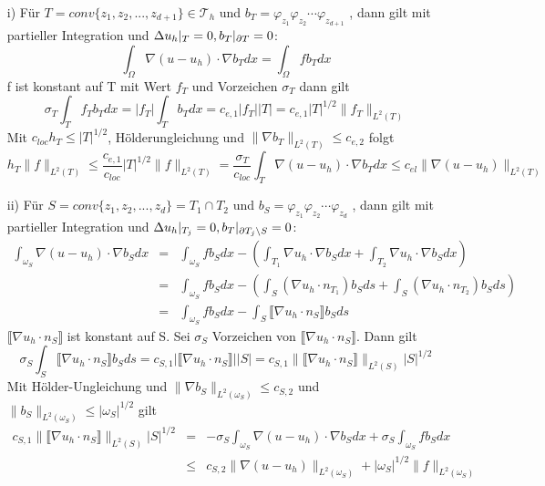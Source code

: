 \begin{itemize}
	\item[i)] 
	Für $T =conv\{z_1,z_2,...,z_{d+1}\} \in\mathscr{T}_h$ und $b_T = \varphi_{z_1}\varphi_{z_2}\cdots\varphi_{z_{d+1}}$ , dann gilt mit partieller Integration und $\Delta u_h|_T = 0, b_T|_{\partial T} = 0$:
	\[
	\int_{\Omega} \nabla (u - u_h) \cdot \nabla b_Tdx =\int_{\Omega} f b_T dx
	\]
    f ist konstant auf T mit Wert $f_T$ und Vorzeichen $\sigma_T$ dann gilt
    \[
    \sigma_T\int_{T}f_Tb_Tdx=|f_T|\int_{T}b_Tdx=c_{e,1}|f_T||T|= c_{e,1}|T|^{1/2}\|f_T\|_{L^2(T)}
    \]
    Mit $c_{loc}h_T \leq |T|^{1/2}$, Hölderungleichung und $\|\nabla b_T\|_{L^2(T)} \leq c_{e,2}$ folgt
    \[
    h_T\|f\|_{L^2(T)}\leq \frac{c_{e,1}}{c_{loc}} |T|^{1/2}\|f\|_{L^2(T)} =\frac{\sigma_T}{c_{loc}}\int_{T}\nabla (u - u_h) \cdot \nabla b_Tdx \leq c_{el} \|\nabla (u-u_h)\|_{L^2(T)}
    \]
    \item[ii)]
    Für $S =conv\{z_1,z_2,...,z_{d}\} = T_1 \cap T_2$ und $b_S = \varphi_{z_1}\varphi_{z_2}\cdots\varphi_{z_{d}}$ , dann gilt mit partieller Integration und $\Delta u_h|_{T_j} = 0, b_T|_{\partial T_j\setminus S} = 0$:
    \begin{eqnarray*}
    	\int_{\omega_S} \nabla (u-u_h)\cdot \nabla b_S dx &=& \int_{\omega_S} fb_Sdx -\left(\int_{T_1} \nabla u_h\cdot \nabla b_S dx + \int_{T_2} \nabla u_h\cdot \nabla b_S dx\right) \\
    	&=& \int_{\omega_S} fb_Sdx - \left(\int_{S} (\nabla u_h\cdot n_{T_1}) b_S ds + \int_{S} (\nabla u_h\cdot n_{T_2}) b_S ds\right)\\
    	&=& \int_{\omega_S} fb_Sdx - \int_{S} \llbracket \nabla u_h \cdot n_S\rrbracket b_S ds
    \end{eqnarray*}
    $\llbracket \nabla u_h \cdot n_S\rrbracket$ ist konstant auf S. Sei $\sigma_S$ Vorzeichen von $\llbracket \nabla u_h \cdot n_S\rrbracket$. Dann gilt
    \[
    \sigma_S \int_{S} \llbracket \nabla u_h \cdot n_S\rrbracket b_S ds = c_{S,1}|\llbracket \nabla u_h \cdot n_S\rrbracket||S| =c_{S,1}\|\llbracket \nabla u_h \cdot n_S\rrbracket\|_{L^2(S)}|S|^{1/2}
    \] 
	Mit Hölder-Ungleichung und $\|\nabla b_S\|_{L^2(\omega_S)} \leq c_{S,2}$ und $\|b_S\|_{L^2(\omega_S)} \leq |\omega_S|^{1/2}$ gilt
	\begin{eqnarray*}
		c_{S,1}\|\llbracket \nabla u_h \cdot n_S\rrbracket\|_{L^2(S)}|S|^{1/2} &=& -\sigma_S\int_{\omega_S} \nabla (u-u_h)\cdot \nabla b_S dx +\sigma_S\int_{\omega_S} fb_Sdx \\
		&\leq& c_{S,2} \|\nabla (u-u_h)\|_{L^2(\omega_S)} + |\omega_S|^{1/2}\|f\|_{L^2(\omega_S)}

\end{eqnarray*}
\end{itemize}
